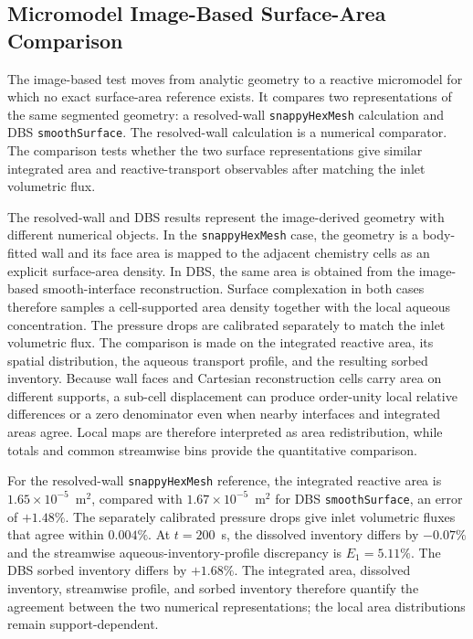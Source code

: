\FloatBarrier

\subsection{Micromodel Image-Based Surface-Area Comparison}

The image-based test moves from analytic geometry to a reactive micromodel for
which no exact surface-area reference exists. It compares two representations
of the same segmented geometry: a resolved-wall \texttt{snappyHexMesh}
calculation and DBS \texttt{smoothSurface}. The resolved-wall calculation is a
numerical comparator. The comparison tests whether the two surface
representations give similar integrated area and reactive-transport observables
after matching the inlet volumetric flux.

The resolved-wall and DBS results represent the image-derived geometry with
different numerical objects. In the \texttt{snappyHexMesh} case, the geometry
is a body-fitted wall and its face area is mapped to the adjacent chemistry
cells as an explicit surface-area density. In DBS, the same area is obtained
from the image-based smooth-interface reconstruction. Surface complexation in
both cases therefore samples a cell-supported area density together with the
local aqueous concentration. The pressure drops are calibrated separately to
match the inlet volumetric flux. The comparison is made on the integrated
reactive area, its spatial distribution, the aqueous transport profile, and the
resulting sorbed inventory. Because wall faces and Cartesian reconstruction
cells carry area on different supports, a sub-cell displacement can produce
order-unity local relative differences or a zero denominator even when nearby
interfaces and integrated areas agree. Local maps are therefore interpreted as
area redistribution, while totals and common streamwise bins provide the
quantitative comparison.

For the resolved-wall \texttt{snappyHexMesh} reference, the integrated
reactive area is $1.65 \times 10^{-5}$~m$^2$, compared with
$1.67 \times 10^{-5}$~m$^2$ for DBS \texttt{smoothSurface}, an error of
$+1.48\%$. The separately calibrated pressure drops give inlet volumetric
fluxes that agree within $0.004\%$. At $t=200$~s, the dissolved inventory
differs by $-0.07\%$ and the streamwise aqueous-inventory-profile discrepancy is
$E_1=5.11\%$.
The DBS sorbed inventory differs by $+1.68\%$. The integrated area, dissolved
inventory, streamwise profile, and sorbed inventory therefore quantify the
agreement between the two numerical representations; the local area
distributions remain support-dependent.


